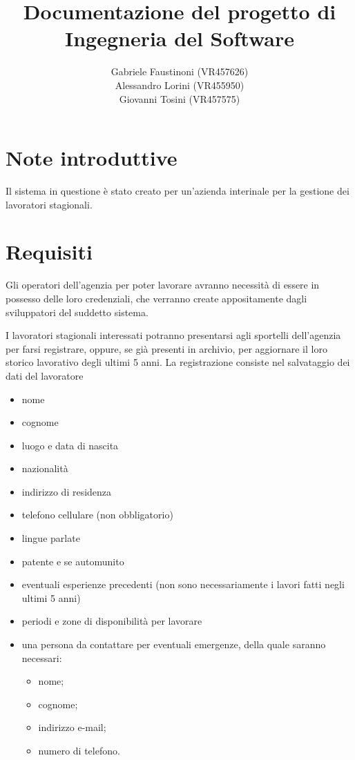 \documentclass{article}
\title{Documentazione del progetto di \\ Ingegneria del Software}
\author{Gabriele Faustinoni (VR457626) \\ Alessandro Lorini (VR455950) \\ Giovanni Tosini (VR457575)}
\date{}
\begin{document}
    \begin{titlepage}
        \maketitle
    \end{titlepage}

    \newpage
    \tableofcontents
    \newpage

    \section{Note introduttive}

    Il sistema in questione è stato creato per un'azienda interinale 
    per la gestione dei lavoratori stagionali.

    \section{Requisiti}

    Gli operatori dell'agenzia per poter lavorare avranno necessità di essere in possesso delle loro credenziali, che verranno create appositamente dagli sviluppatori del suddetto sistema.

    I lavoratori stagionali interessati potranno presentarsi agli sportelli dell'agenzia per farsi registrare, oppure, se già presenti in archivio, per aggiornare il loro storico lavorativo degli ultimi 5 anni.
    La registrazione consiste nel salvataggio dei dati del lavoratore

    \begin{itemize}
        \item nome
        \item cognome
        \item luogo e data di nascita
        \item nazionalità
        \item indirizzo di residenza
        \item telefono cellulare (non obbligatorio)
        \item lingue parlate
        \item patente e se automunito
        \item eventuali esperienze precedenti (non sono necessariamente i lavori fatti negli ultimi 5 anni)
        \item periodi e zone di disponibilità per lavorare
        \item una persona da contattare per eventuali emergenze, della quale saranno necessari: 
        \begin{itemize}
            \item nome;
            \item cognome;
            \item indirizzo e-mail;
            \item numero di telefono.
        \end{itemize}
    \end{itemize}
\end{document}
